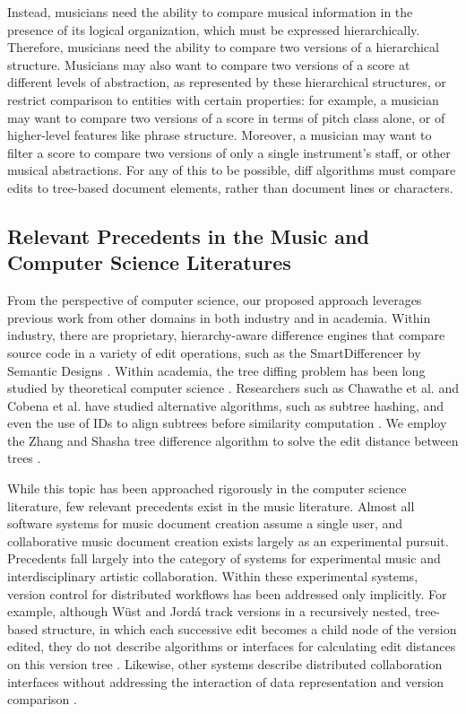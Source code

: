 \documentclass{article}
\begin{document}
Instead, musicians need the ability to compare musical information in
the presence of its logical organization, which must be expressed
hierarchically.  Therefore, musicians need the ability to compare two
versions of a hierarchical structure. Musicians may also want to
compare two versions of a score at different levels of abstraction, as
represented by these hierarchical structures, or restrict comparison
to entities with certain properties: for example, a musician may want
to compare two versions of a score in terms of pitch class alone, or
of higher-level features like phrase structure. Moreover, a musician
may want to filter a score to compare two versions of only a single
instrument's staff, or other musical abstractions. For any of this to be possible, diff algorithms must compare edits to tree-based document elements, rather than document lines or characters.

\subsection{Relevant Precedents in the Music and Computer Science Literatures}
From the perspective of computer science, our proposed approach leverages previous work from other domains in both
industry and in academia.  Within industry, there are proprietary,
hierarchy-aware difference engines that compare source code in a variety of 
edit operations, such as the SmartDifferencer by Semantic Designs
\cite{Designs:qm}.  Within academia, the tree diffing problem has been
long studied by theoretical computer science \cite{Bille:2005ec}.
Researchers such as Chawathe et al. and Cobena et
al. have studied alternative algorithms, such as subtree hashing, 
and even the use of IDs to align subtrees before similarity 
computation \cite{Chawathe:1996jb,Cobena:2002gd}.  We employ the Zhang 
and Shasha tree difference algorithm to solve the edit distance between
trees \cite{Zhang:1989ec,Zhang:1989il}.

While this topic has been approached rigorously in the computer science literature, few relevant precedents exist in the music literature. Almost all software systems for music document creation assume a single user, and collaborative music document creation exists largely as an experimental pursuit. Precedents fall largely into the category of systems for experimental music and interdisciplinary artistic collaboration. Within these experimental systems, version control for distributed workflows has been addressed only implicitly. For example, although W\"{u}st and Jord\'{a} track versions in a recursively nested, tree-based structure, in which each successive edit becomes a child node of the version edited, they do not describe algorithms or interfaces for calculating edit distances on this version tree \cite{wust2001architectural}. Likewise, other systems describe distributed collaboration interfaces without addressing the interaction of data representation and version comparison \cite{Balachandran:2012cr,Hepting2005}.
\end{document}

